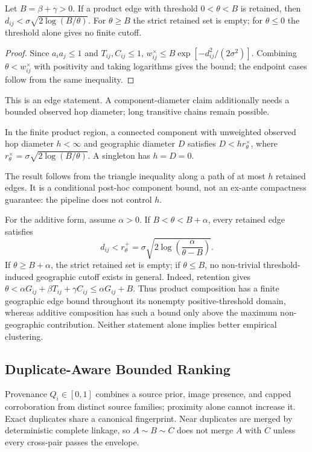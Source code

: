 \documentclass[runningheads]{llncs}
\begin{document}
\begin{theorem}
Let $B=\beta+\gamma>0$. If a product edge with threshold $0<\theta<B$ is
retained, then
$d_{ij}<\sigma\sqrt{2\log(B/\theta)}$. For $\theta\ge B$ the strict retained
set is empty; for $\theta\le0$ the threshold alone gives no finite cutoff.
\end{theorem}
\begin{proof}
Since $a_ia_j\le1$ and $T_{ij},C_{ij}\le1$,
$w^\times_{ij}\le B\exp[-d_{ij}^{2}/(2\sigma^2)]$. Combining
$\theta<w^\times_{ij}$ with positivity and taking logarithms gives the bound;
the endpoint cases follow from the same inequality.
\end{proof}
This is an edge statement. A component-diameter claim additionally needs a
bounded observed hop diameter; long transitive chains remain possible.

\begin{corollary}
In the finite product region, a connected component with unweighted observed
hop diameter $h<\infty$ and geographic diameter $D$ satisfies
$D<hr_\theta^\times$, where
$r_\theta^\times=\sigma\sqrt{2\log(B/\theta)}$. A singleton has $h=D=0$.
\end{corollary}
The result follows from the triangle inequality along a path of at most $h$
retained edges. It is a conditional post-hoc component bound, not an ex-ante
compactness guarantee: the pipeline does not control $h$.

For the additive form, assume $\alpha>0$. If
$B<\theta<B+\alpha$, every retained edge satisfies
\[
d_{ij}<r_\theta^+
=\sigma\sqrt{2\log\!\left(\frac{\alpha}{\theta-B}\right)}.
\]
If $\theta\ge B+\alpha$, the strict retained set is empty; if
$\theta\le B$, no non-trivial threshold-induced geographic cutoff exists in
general. Indeed, retention gives
$\theta<\alpha G_{ij}+\beta T_{ij}+\gamma C_{ij}\le\alpha G_{ij}+B$.
Thus product composition has a finite geographic edge bound throughout its
nonempty positive-threshold domain, whereas additive composition has such a
bound only above the maximum non-geographic contribution. Neither statement
alone implies better empirical clustering.

\subsection{Duplicate-Aware Bounded Ranking}

Provenance $Q_i\in[0,1]$ combines a source prior, image presence, and capped
corroboration from distinct source families; proximity alone cannot increase
it. Exact duplicates share a canonical fingerprint. Near duplicates are
merged by deterministic complete linkage, so $A\sim B\sim C$ does not merge
$A$ with $C$ unless every cross-pair passes the envelope.
\end{document}
